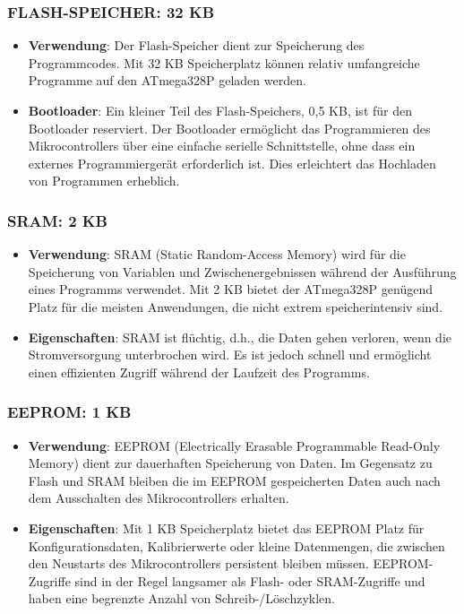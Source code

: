 \documentclass{vorlage-design-main}
\begin{document}
\hypertarget{flash-speicher-32-kb}{%
\subsubsection{FLASH-SPEICHER: 32 KB}\label{flash-speicher-32-kb}}

\begin{itemize}

\item
  \textbf{Verwendung}: Der Flash-Speicher dient zur Speicherung des
  Programmcodes. Mit 32 KB Speicherplatz können relativ umfangreiche
  Programme auf den ATmega328P geladen werden.
\item
  \textbf{Bootloader}: Ein kleiner Teil des Flash-Speichers, 0,5 KB, ist
  für den Bootloader reserviert. Der Bootloader ermöglicht das
  Programmieren des Mikrocontrollers über eine einfache serielle
  Schnittstelle, ohne dass ein externes Programmiergerät erforderlich
  ist. Dies erleichtert das Hochladen von Programmen erheblich.
\end{itemize}

\hypertarget{sram-2-kb}{%
\subsubsection{SRAM: 2 KB}\label{sram-2-kb}}

\begin{itemize}

\item
  \textbf{Verwendung}: SRAM (Static Random-Access Memory) wird für die
  Speicherung von Variablen und Zwischenergebnissen während der
  Ausführung eines Programms verwendet. Mit 2 KB bietet der ATmega328P
  genügend Platz für die meisten Anwendungen, die nicht extrem
  speicherintensiv sind.
\item
  \textbf{Eigenschaften}: SRAM ist flüchtig, d.h., die Daten gehen
  verloren, wenn die Stromversorgung unterbrochen wird. Es ist jedoch
  schnell und ermöglicht einen effizienten Zugriff während der Laufzeit
  des Programms.
\end{itemize}

\hypertarget{eeprom-1-kb}{%
\subsubsection{EEPROM: 1 KB}\label{eeprom-1-kb}}

\begin{itemize}

\item
  \textbf{Verwendung}: EEPROM (Electrically Erasable Programmable
  Read-Only Memory) dient zur dauerhaften Speicherung von Daten. Im
  Gegensatz zu Flash und SRAM bleiben die im EEPROM gespeicherten Daten
  auch nach dem Ausschalten des Mikrocontrollers erhalten.
\item
  \textbf{Eigenschaften}: Mit 1 KB Speicherplatz bietet das EEPROM Platz
  für Konfigurationsdaten, Kalibrierwerte oder kleine Datenmengen, die
  zwischen den Neustarts des Mikrocontrollers persistent bleiben müssen.
  EEPROM-Zugriffe sind in der Regel langsamer als Flash- oder
  SRAM-Zugriffe und haben eine begrenzte Anzahl von
  Schreib-/Löschzyklen.
\end{itemize}
\end{document}
